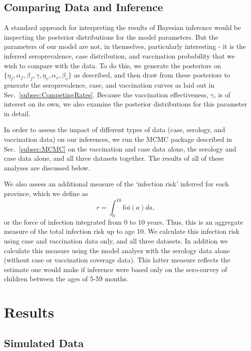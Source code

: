 \documentclass[nofootinbib,aps,pre,twocolumn,superscriptaddress,showkeys,showpacs]{revtex4-1}
\begin{document}
\subsection{Comparing Data and Inference \label{subsec:Comp}}
A standard approach for interpreting the results of Bayesian inference would be inspecting the posterior distributions for the model parameters. But the parameters of our model are not, in themselves, particularly interesting - it is the inferred seroprevalence, case distribution, and vaccination probability that we wish to compare with the data. To do this, we generate the posteriors on $\{\eta_f, \alpha_f, \beta_f, \gamma, \eta_v, \alpha_v, \beta_v\}$ as described, and then draw from these posteriors to generate the seroprevalence, case, and vaccination curves as laid out in Sec.~\ref{subsec:CompetingRates}. Because the vaccination effectiveness, $\gamma$, is of interest on its own, we also examine the posterior distributions for this parameter in detail.

In order to assess the impact of different types of data (case, serology, and vaccination data) on our inferences, we run the MCMC package described in Sec.~\ref{subsec:MCMC} on the vaccination and case data alone, the serology and case data alone, and all three datasets together. The results of all of these analyses are discussed below.

We also assess an additional measure of the `infection risk' inferred for each province, which we define as
\begin{equation}
r = \int_0^{10} \mathrm{foi}(a) da,
\end{equation}
 or the force of infection integrated from 0 to $10$ years.  Thus, this is an aggregate measure of the total infection risk up to age 10. We calculate this infection risk using  case and vaccination data only, and all three datasets. In addition we calculate this measure using the model analyez with the serology data alone (without case or vaccination coverage data).  This latter measure reflects the estimate one would make if inference were based only on the sero-survey of children between the ages of 5-59 months.  
 
\section{Results \label{sec:Results}}
\subsection{Simulated Data \label{subsec:SimDat}}
\end{document}
